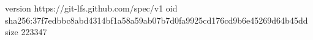 version https://git-lfs.github.com/spec/v1
oid sha256:37f7edbbc8abd4314bf1a58a59ab07b7d0fa9925cd176cd9b6e45269d64b45dd
size 223347
